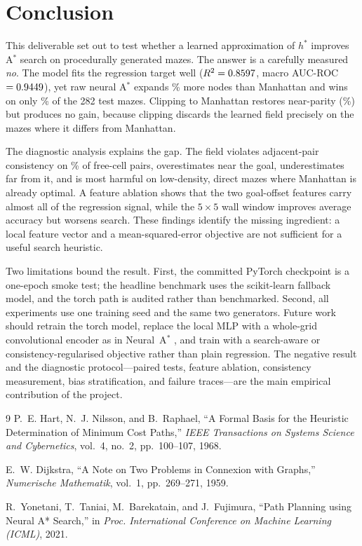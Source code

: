 \documentclass[11pt]{article}
\begin{document}
\section{Conclusion}
This deliverable set out to test whether a learned approximation of $h^\ast$ improves
A$^\ast$ search on procedurally generated mazes. The answer is a carefully measured
\emph{no}. The model fits the regression target well ($R^2=0.8597$, macro AUC-ROC
$=0.9449$), yet raw neural A$^\ast$ expands \PfiveRawRelative{}\% more nodes than
Manhattan and wins on only \PfiveRawWins{}\% of the 282 test mazes. Clipping to Manhattan
restores near-parity (\PfiveClipRelative{}\%) but produces no gain, because clipping
discards the learned field precisely on the mazes where it differs from Manhattan.

The diagnostic analysis explains the gap. The field violates adjacent-pair consistency on
\PfiveConsistencyRaw{}\% of free-cell pairs, overestimates near the goal, underestimates
far from it, and is most harmful on low-density, direct mazes where Manhattan is already
optimal. A feature ablation shows that the two goal-offset features carry almost all of the
regression signal, while the $5\times5$ wall window improves average accuracy but worsens
search. These findings identify the missing ingredient: a local feature vector and a
mean-squared-error objective are not sufficient for a useful search heuristic.

Two limitations bound the result. First, the committed PyTorch checkpoint is a one-epoch
smoke test; the headline benchmark uses the scikit-learn fallback model, and the torch
path is audited rather than benchmarked. Second, all experiments use one training seed and
the same two generators. Future work should retrain the torch model, replace the local MLP
with a whole-grid convolutional encoder as in Neural~A$^\ast$ \cite{yonetani2021}, and train
with a search-aware or consistency-regularised objective rather than plain regression.
The negative result and the diagnostic protocol---paired tests, feature ablation,
consistency measurement, bias stratification, and failure traces---are the main empirical
contribution of the project.

\begin{thebibliography}{9}
P.~E. Hart, N.~J. Nilsson, and B.~Raphael,
``A Formal Basis for the Heuristic Determination of Minimum Cost Paths,''
\emph{IEEE Transactions on Systems Science and Cybernetics}, vol.~4, no.~2, pp.~100--107, 1968.

E.~W. Dijkstra,
``A Note on Two Problems in Connexion with Graphs,''
\emph{Numerische Mathematik}, vol.~1, pp.~269--271, 1959.

R.~Yonetani, T.~Taniai, M.~Barekatain, and J.~Fujimura,
``Path Planning using Neural A* Search,''
in \emph{Proc. International Conference on Machine Learning (ICML)}, 2021.
\end{thebibliography}
\end{document}
